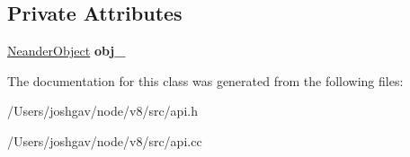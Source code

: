 \subsection*{Private Attributes}
\begin{DoxyCompactItemize}
\item 
\hyperlink{classv8_1_1_neander_object}{Neander\+Object} {\bfseries obj\+\_\+}\hypertarget{classv8_1_1_neander_array_a8e1674ed2e625813e53fc8cabad6e3d1}{}\label{classv8_1_1_neander_array_a8e1674ed2e625813e53fc8cabad6e3d1}

\end{DoxyCompactItemize}


The documentation for this class was generated from the following files\+:\begin{DoxyCompactItemize}
\item 
/\+Users/joshgav/node/v8/src/api.\+h\item 
/\+Users/joshgav/node/v8/src/api.\+cc\end{DoxyCompactItemize}
